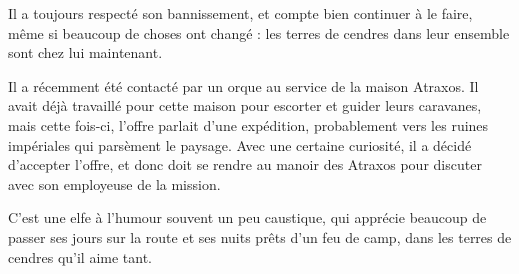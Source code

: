 \documentclass[10pt,a4paper]{article}
\begin{document}
Il a toujours respecté son bannissement, et compte bien continuer à le faire, même si beaucoup de choses ont changé : les terres de cendres dans leur ensemble sont chez lui maintenant.

Il a récemment été contacté par un orque au service de la maison Atraxos. Il avait déjà travaillé pour cette maison pour escorter et guider leurs caravanes, mais cette fois-ci, l'offre parlait d'une expédition, probablement vers les ruines impériales qui parsèment le paysage. Avec une certaine curiosité, il a décidé d'accepter l'offre, et donc doit se rendre au manoir des Atraxos pour discuter avec son employeuse de la mission.

C'est une elfe à l'humour souvent un peu caustique, qui apprécie beaucoup de passer ses jours sur la route et ses nuits prêts d'un feu de camp, dans les terres de cendres qu'il aime tant.
\end{document}
